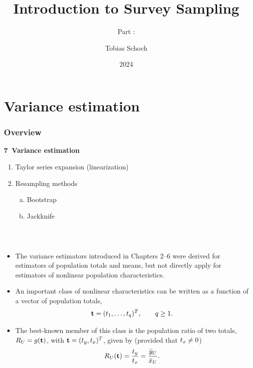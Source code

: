 \documentclass{my_eth_beamer}
\title{Introduction to Survey Sampling}
\subtitle{Part \NR: \TITLE}
\author[Tobias Schoch]{Tobias Schoch}
\date{2024}
\numberwithin{equation}{section}
\newcommand{\TITLE}{Variance estimation}
\newcommand{\NR}{7}
\begin{document}
\section{\TITLE}\label{sec:variance}
\setcounter{section}{\NR}
\setcounter{Bsp}{19}
\setcounter{Def}{13}
\setcounter{EinSatz}{1}


\begin{frame}
    \frametitle{Overview}
    \noindent \hspace{0.2em}\textcolor{fhnwblue}{\bfseries \NR~\TITLE}
    \begin{enumerate}[\NR.1]
    \setlength{\itemsep}{4pt}
        \item Taylor series expansion (linearization)
        \item Resampling methods
            \begin{enumerate}[a)]
            \setlength{\itemsep}{4pt}
                \item Bootstrap
                \item Jackknife
            \end{enumerate}
    \end{enumerate}
\end{frame}

\begin{frame}
    \frametitle{\insertsectionnumber~\insertsection}
    \begin{itemize}
    \setlength{\itemsep}{10pt}
        \item The variance estimators introduced in Chapters 2--6 were derived
            for estimators of population totals and means, but not directly
            apply for estimators of \alert{nonlinear} population
            characteristics.
        \item An important \alert{class} of nonlinear characteristics can be
            written as a \alert{function} of a vector of population totals,
            \begin{equation*}
                \bold t = (t_1, \ldots, t_q)^T, \qquad q \geq 1.
            \end{equation*}
        \item The best-known member of this class is the \alert{population
            ratio} of two totals, $R_U = g(\bold t)$, with $\bold
            t=(t_y,t_x)^T$, given by (provided that $t_x \neq 0$)
            \begin{equation*}
                R_U(\bold t) = \frac{t_y}{t_x} = \frac{\bar{y}_U}{\bar{x}_U}.
            \end{equation*}
    \end{itemize}
\end{frame}
\end{document}
